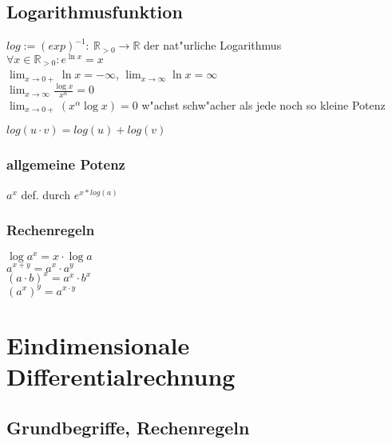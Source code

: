 \documentclass[10pt, a4paper, twocolumn]{scrartcl}
\begin{document}
\subsection{Logarithmusfunktion}
$log := (exp)^{-1}:\:\mathbb{R}_{>0}\rightarrow \mathbb{R}$ der nat"urliche Logarithmus\\
$\forall x\in \mathbb{R}_{>0}: e^{\ln x}=x$\\
$\lim_{x \to 0+}\ln x =-\infty$, $\lim_{x \to \infty}\ln x =\infty$\\

$\lim_{x\to\infty}\frac{\log x}{x^\alpha}=0$\\
$\lim_{x\to 0+}(x^\alpha\log x)=0$ w"achst schw"acher als jede noch so kleine Potenz

$log(u\cdotp v)=log(u) + log(v)$

\subsubsection{allgemeine Potenz}
$a^x$ def. durch $e^{x*log(a)}$

\subsubsection{Rechenregeln}
$\log a^x=x\cdotp\log a$\\
$a^{x+y}=a^x\cdotp a^y$\\
$(a \cdotp b)^x = a^x \cdotp b^x$\\
$(a^x)^y = a^{x\cdotp y}$


\section{Eindimensionale Differentialrechnung}

\subsection{Grundbegriffe, Rechenregeln}
\end{document}
